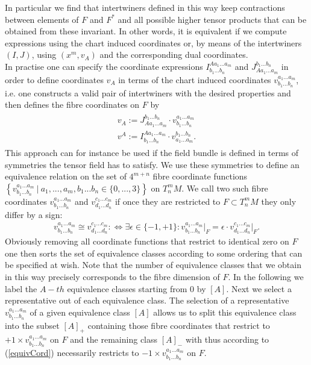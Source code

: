 \documentclass[a4paper,12pt, DIV=14, BCOR=5mm, twoside, headsepline]{scrbook}
\begin{document}
In particular we find that intertwiners defined in this way keep contractions between elements of $F$ and $F^{\ast}$ and all possible higher tensor products that can be obtained from these invariant. In other words, it is equivalent if we compute expressions using the chart induced coordinates or, by means of the intertwiners $(I,J)$, using $(x^m, v_A)$ and the corresponding dual coordinates. \\

In practise one can specify the coordinate expressions $I^{A a_1 ... a_m}_{b_1 ... b_n}$ and $J^{b_1 ... b_n}_{A a_1 ... a_m}$ in order to define coordinates $v_A$ in terms of the chart induced coordinates $v^{a_1 ... a_m}_{b_1 ... b_n}$, i.e. one constructs a valid pair of intertwiners with the desired properties and then defines the fibre coordinates on $F$ by
\begin{align}
    \begin{aligned}
    v_A := J^{b_1 ... b_n}_{A a_1 ... a_m} \cdot v^{a_1 ... a_m}_{b_1 ... b_n}\\
    v^A := I^{A a_1 ... a_m}_{b_1 ... b_n} \cdot  v^{b_1 ... b_n}_{a_1 ... a_m} .
    \end{aligned}
\end{align}
This approach can for instance be used if the field bundle is defined in terms of symmetries the tensor field has to satisfy. We use these symmetries to define an equivalence relation on the set of $4^{m+n}$ fibre coordinate functions $\left \{ v^{a_1 ... a_m}_{b_1 ... b_n} \ \vert \  a_1,...,a_m,b_1...b_n \in \{0,...,3 \} \right \}$ on $T^m_nM$. We call two such fibre coordinates $v^{a_1 ... a_m}_{b_1 ... b_n}$ and $v^{c_1 ... c_m}_{d_1 ... d_n}$ if once they are restricted to $F \subset T^m_nM$ they only differ by a sign:
\begin{align}\label{equivCord}
v^{a_1 ... a_m}_{b_1 ... b_n} \cong v^{c_1 ... c_m}_{d_1 ... d_n} : \iff \exists \epsilon \in \{-1,+1 \} : v^{a_1 ... a_m}_{b_1 ... b_n}\vert _F = \epsilon \cdot  v^{c_1 ... c_m}_{d_1 ... d_n}\vert_F.
\end{align}
Obviously removing all coordinate functions that restrict to identical zero on $F$ one then sorts the set of equivalence classes according to some ordering that can be specified at wish.  Note that the number of equivalence classes that we obtain in this way precisely corresponds to the fibre dimension of $F$. In the following we label the $A-th$ equivalence classes  starting from 0 by $[A]$. Next we select a representative out of each equivalence class.  The selection of a representative $v^{a_1 ... a_m}_{b_1 ... b_n}$ of a given equivalence class $[A]$ allows us to split this equivalence class into the subset $[A]_+$ containing those fibre coordinates that restrict to $+1 \times v^{a_1 ... a_m}_{b_1 ... b_n}$  on $F$ and the remaining class $[A]_-$ with thus according to (\ref{equivCord}) necessarily restricts to $-1 \times v^{a_1 ... a_m}_{b_1 ... b_n}$ on $F$.
\end{document}
